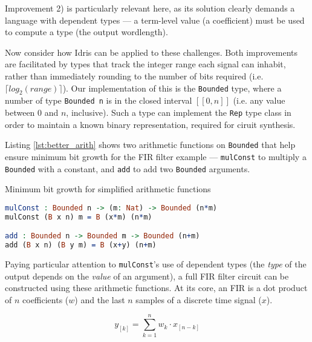 \documentclass[conference]{IEEEtran}
\begin{document}
Improvement 2) is particularly relevant here, as its solution clearly demands a
language with dependent types --- a term-level value (a coefficient) must be
used to compute a type (the output wordlength).


Now consider how Idris can be applied to these challenges. Both improvements are
facilitated by types that track the integer range each signal can inhabit,
rather than immediately rounding to the number of bits required (i.e. $\lceil
log_2(range) \rceil$). Our implementation of this is the \texttt{Bounded} type,
where a number of type \texttt{Bounded n} is in the closed interval $[\![0,n]\!]$
(i.e. any value between 0 and $n$, inclusive). Such a type can implement the
\texttt{Rep} type class in order to maintain a known binary representation,
required for ciruit synthesis.

Listing \ref{lst:better_arith} shows two arithmetic functions on
\texttt{Bounded} that help ensure minimum bit growth for the FIR filter example
--- \texttt{mulConst} to multiply a \texttt{Bounded} with a constant, and
\texttt{add} to add two \texttt{Bounded} arguments.

\begin{codefig}[h]
  \caption{Minimum bit growth for simplified arithmetic functions}
\begin{lstlisting}[language=idris]
mulConst : Bounded n -> (m: Nat) -> Bounded (n*m)
mulConst (B x n) m = B (x*m) (n*m)

add : Bounded n -> Bounded m -> Bounded (n+m)
add (B x n) (B y m) = B (x+y) (n+m)
\end{lstlisting}
\label{lst:better_arith}
\end{codefig}

Paying particular attention to \texttt{mulConst}'s use of dependent types (the
\emph{type} of the output depends on the \emph{value} of an argument), a full
FIR filter circuit can be constructed using these arithmetic functions. At its
core, an FIR is a dot product of $n$ coefficients ($w$) and the last $n$ samples
of a discrete time signal ($x$).

\begin{equation}
  y_{[k]} = \sum_{k=1}^{n} w_k \cdot x_{[n-k]}
\label{eqn:fir}
\end{equation}
\end{document}

